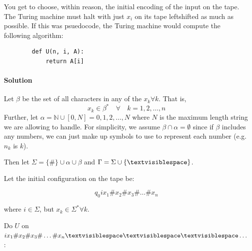 \documentclass[11pt]{article}
\newcommand{\solution}[1]{\paragraph{Solution}  }
\begin{document}
\begin{enumerate}
    You get to choose, within reason, the initial encoding of the input on the tape. The Turing machine must halt with just $x_i$ on its tape leftshifted as much as possible. If this was psuedocode, the Turing machine would compute the following algorithm:
    \begin{verbatim}
        def U(n, i, A):
            return A[i]
    \end{verbatim}

    \solution{} Let $\beta$ be the set of all characters in any of the $x_k \forall k$. That is, $$x_k \in \beta^* \quad \forall \quad k=1,2,\dots,n$$
    Further, let $\alpha = \mathbb{N} \cup [0, N] = 0, 1, 2, \dots, N$ where $N$ is the maximum length string we are allowing to handle. For simplicity, we assume $\beta \cap \alpha = \emptyset$ since if $\beta$ includes any numbers, we can just make up symbols to use to represent each number (e.g. $n_k$ is $k$). 

    Then let $\Sigma = \{\#\} \cup \alpha \cup \beta$ and $\Gamma = \Sigma \cup \{\textvisiblespace\}$.

    Let the initial configuration on the tape be:

    $$q_0ix_1\#x_2\#x_3\#\dots\#x_n$$

    where $i \in \Sigma$, but $x_k \in \Sigma^* \forall k$.

    Do $U$ on $ix_1\#x_2\#x_3\#\dots\#x_n\textvisiblespace\textvisiblespace\textvisiblespace\dots$:


\end{enumerate}
\end{document}
